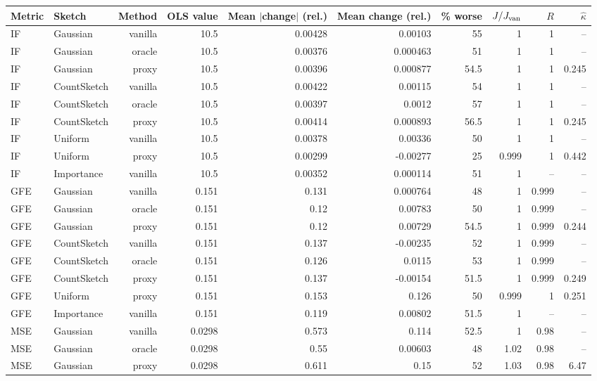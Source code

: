 \begin{table}[t]
\centering
\small
\begin{tabular}{llrrrrrrrr}
\toprule
Metric & Sketch & Method & OLS value & Mean $|$change$|$ (rel.) & Mean change (rel.) & \% worse & $J/J_{\rm van}$ & $R$ & $\hat\kappa$ \\
\midrule
IF & Gaussian & vanilla & 10.5 & 0.00428 & 0.00103 & 55 & 1 & 1 & -- \\
IF & Gaussian & oracle & 10.5 & 0.00376 & 0.000463 & 51 & 1 & 1 & -- \\
IF & Gaussian & proxy & 10.5 & 0.00396 & 0.000877 & 54.5 & 1 & 1 & 0.245 \\
IF & CountSketch & vanilla & 10.5 & 0.00422 & 0.00115 & 54 & 1 & 1 & -- \\
IF & CountSketch & oracle & 10.5 & 0.00397 & 0.0012 & 57 & 1 & 1 & -- \\
IF & CountSketch & proxy & 10.5 & 0.00414 & 0.000893 & 56.5 & 1 & 1 & 0.245 \\
IF & Uniform & vanilla & 10.5 & 0.00378 & 0.00336 & 50 & 1 & 1 & -- \\
IF & Uniform & proxy & 10.5 & 0.00299 & -0.00277 & 25 & 0.999 & 1 & 0.442 \\
IF & Importance & vanilla & 10.5 & 0.00352 & 0.000114 & 51 & 1 & -- & -- \\
\midrule
GFE & Gaussian & vanilla & 0.151 & 0.131 & 0.000764 & 48 & 1 & 0.999 & -- \\
GFE & Gaussian & oracle & 0.151 & 0.12 & 0.00783 & 50 & 1 & 0.999 & -- \\
GFE & Gaussian & proxy & 0.151 & 0.12 & 0.00729 & 54.5 & 1 & 0.999 & 0.244 \\
GFE & CountSketch & vanilla & 0.151 & 0.137 & -0.00235 & 52 & 1 & 0.999 & -- \\
GFE & CountSketch & oracle & 0.151 & 0.126 & 0.0115 & 53 & 1 & 0.999 & -- \\
GFE & CountSketch & proxy & 0.151 & 0.137 & -0.00154 & 51.5 & 1 & 0.999 & 0.249 \\
GFE & Uniform & proxy & 0.151 & 0.153 & 0.126 & 50 & 0.999 & 1 & 0.251 \\
GFE & Importance & vanilla & 0.151 & 0.119 & 0.00802 & 51.5 & 1 & -- & -- \\
\midrule
MSE & Gaussian & vanilla & 0.0298 & 0.573 & 0.114 & 52.5 & 1 & 0.98 & -- \\
MSE & Gaussian & oracle & 0.0298 & 0.55 & 0.00603 & 48 & 1.02 & 0.98 & -- \\
MSE & Gaussian & proxy & 0.0298 & 0.611 & 0.15 & 52 & 1.03 & 0.98 & 6.47 \\

\end{tabular}
\end{table}
